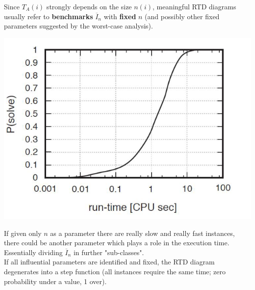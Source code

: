 \documentclass[11pt]{article}
\begin{document}
	Since $T_A (i )$ strongly depends on the size $n (i )$, meaningful RTD diagrams usually refer to \textbf{benchmarks} $\overline{I}_n$ with \textbf{fixed} $n$ (and possibly other fixed parameters suggested by the worst-case analysis).
	\begin{center}
		\includegraphics[width=0.75\columnwidth]{img/RTD1}
	\end{center}
	If given only $n$ as a parameter there are really slow and really fast instances, there could be another parameter which plays a role in the execution time. Essentially dividing $\overline{I}_n$ in further "sub-classes".\\
	
	If all influential parameters are identified and fixed, the RTD diagram degenerates into a step function (all instances require the same time; zero probability under a value, 1 over).\\
	
	\newpage
	
\end{document}
